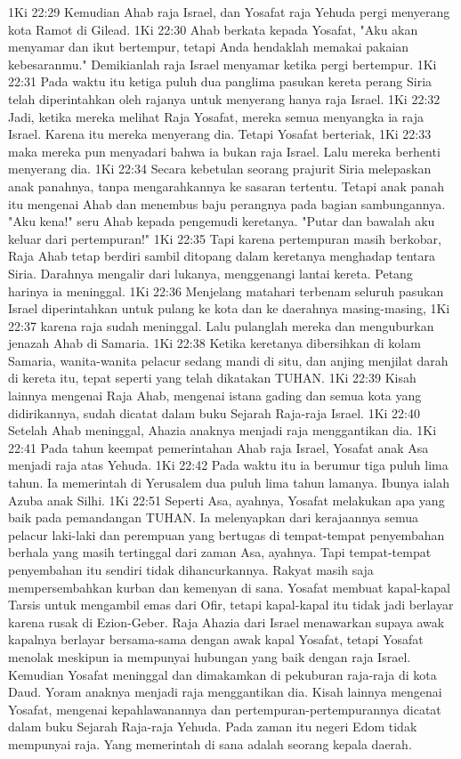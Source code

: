 1Ki 22:29  Kemudian Ahab raja Israel, dan Yosafat raja Yehuda pergi menyerang kota Ramot di Gilead.
1Ki 22:30  Ahab berkata kepada Yosafat, "Aku akan menyamar dan ikut bertempur, tetapi Anda hendaklah memakai pakaian kebesaranmu." Demikianlah raja Israel menyamar ketika pergi bertempur.
1Ki 22:31  Pada waktu itu ketiga puluh dua panglima pasukan kereta perang Siria telah diperintahkan oleh rajanya untuk menyerang hanya raja Israel.
1Ki 22:32  Jadi, ketika mereka melihat Raja Yosafat, mereka semua menyangka ia raja Israel. Karena itu mereka menyerang dia. Tetapi Yosafat berteriak,
1Ki 22:33  maka mereka pun menyadari bahwa ia bukan raja Israel. Lalu mereka berhenti menyerang dia.
1Ki 22:34  Secara kebetulan seorang prajurit Siria melepaskan anak panahnya, tanpa mengarahkannya ke sasaran tertentu. Tetapi anak panah itu mengenai Ahab dan menembus baju perangnya pada bagian sambungannya. "Aku kena!" seru Ahab kepada pengemudi keretanya. "Putar dan bawalah aku keluar dari pertempuran!"
1Ki 22:35  Tapi karena pertempuran masih berkobar, Raja Ahab tetap berdiri sambil ditopang dalam keretanya menghadap tentara Siria. Darahnya mengalir dari lukanya, menggenangi lantai kereta. Petang harinya ia meninggal.
1Ki 22:36  Menjelang matahari terbenam seluruh pasukan Israel diperintahkan untuk pulang ke kota dan ke daerahnya masing-masing,
1Ki 22:37  karena raja sudah meninggal. Lalu pulanglah mereka dan menguburkan jenazah Ahab di Samaria.
1Ki 22:38  Ketika keretanya dibersihkan di kolam Samaria, wanita-wanita pelacur sedang mandi di situ, dan anjing menjilat darah di kereta itu, tepat seperti yang telah dikatakan TUHAN.
1Ki 22:39  Kisah lainnya mengenai Raja Ahab, mengenai istana gading dan semua kota yang didirikannya, sudah dicatat dalam buku Sejarah Raja-raja Israel.
1Ki 22:40  Setelah Ahab meninggal, Ahazia anaknya menjadi raja menggantikan dia.
1Ki 22:41  Pada tahun keempat pemerintahan Ahab raja Israel, Yosafat anak Asa menjadi raja atas Yehuda.
1Ki 22:42  Pada waktu itu ia berumur tiga puluh lima tahun. Ia memerintah di Yerusalem dua puluh lima tahun lamanya. Ibunya ialah Azuba anak Silhi.
1Ki 22:51  Seperti Asa, ayahnya, Yosafat melakukan apa yang baik pada pemandangan TUHAN. Ia melenyapkan dari kerajaannya semua pelacur laki-laki dan perempuan yang bertugas di tempat-tempat penyembahan berhala yang masih tertinggal dari zaman Asa, ayahnya. Tapi tempat-tempat penyembahan itu sendiri tidak dihancurkannya. Rakyat masih saja mempersembahkan kurban dan kemenyan di sana. Yosafat membuat kapal-kapal Tarsis untuk mengambil emas dari Ofir, tetapi kapal-kapal itu tidak jadi berlayar karena rusak di Ezion-Geber. Raja Ahazia dari Israel menawarkan supaya awak kapalnya berlayar bersama-sama dengan awak kapal Yosafat, tetapi Yosafat menolak meskipun ia mempunyai hubungan yang baik dengan raja Israel. Kemudian Yosafat meninggal dan dimakamkan di pekuburan raja-raja di kota Daud. Yoram anaknya menjadi raja menggantikan dia. Kisah lainnya mengenai Yosafat, mengenai kepahlawanannya dan pertempuran-pertempurannya dicatat dalam buku Sejarah Raja-raja Yehuda. Pada zaman itu negeri Edom tidak mempunyai raja. Yang memerintah di sana adalah seorang kepala daerah.
